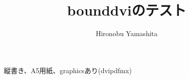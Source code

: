 \documentclass[a5paper,tombow]{tarticle}
\title{\textsf{bounddvi}のテスト}
\author{Hironobu Yamashita}
\begin{document}
縦書き、A5用紙、graphicsあり(dvipdfmx)
\end{document}
